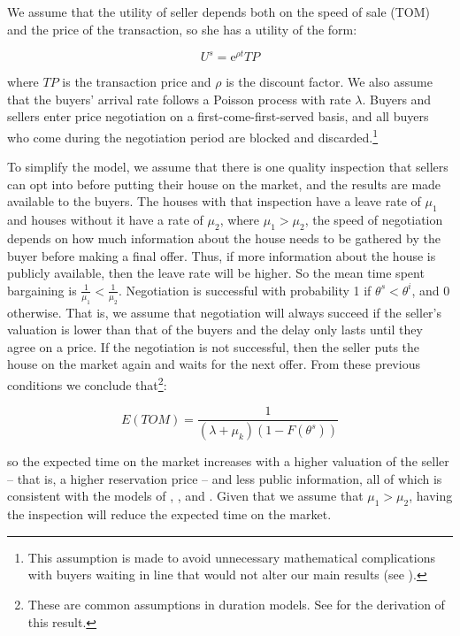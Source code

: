 \documentclass[12pt]{article}
\begin{document}
We assume that the utility of seller depends both on the speed of sale (TOM) and the price of the transaction, so she has a utility of the form:

\begin{equation}
U^s = \mathrm{e}^{\rho t} TP
\end{equation}

\noindent where $TP$ is the transaction price and $\rho$ is the discount factor. We also assume that the buyers' arrival rate follows a Poisson process with rate $\lambda$. Buyers and sellers enter price negotiation on a first-come-first-served basis, and all buyers who come during the negotiation period are blocked and discarded.\footnote{This assumption is made to avoid unnecessary mathematical complications with buyers waiting in line that would not alter our main results (see \citealp{ross2014introduction}).}

To simplify the model, we assume that there is one quality inspection that sellers can opt into before putting their house on the market, and the results are made available to the buyers. The houses with that inspection have a leave rate of $\mu_1$ and houses without it have a rate of $\mu_2$, where $\mu_1 > \mu_2$, the speed of negotiation depends on how much information about the house needs to be gathered by the buyer before making a final offer. Thus, if more information about the house is publicly available, then the leave rate will be higher. So the mean time spent bargaining is $\frac{1}{\mu_1} < \frac{1}{\mu_2}$. Negotiation is successful with probability 1 if $\theta^s < \theta^i$, and 0 otherwise. That is, we assume that negotiation will always succeed if the seller’s valuation is lower than that of the buyers and the delay only lasts until they agree on a price. If the negotiation is not successful, then the seller puts the house on the market again and waits for the next offer. From these previous conditions we conclude that\footnote{These are common assumptions in duration models. See \cite{lancaster1979econometric} for the derivation of this result.}:

\begin{equation}
E(TOM) = \frac{1}{\left( \lambda + \mu_k \right) \left(1 - F(\theta^s) \right)}
\end{equation}
		
\noindent so the expected time on the market increases with a higher valuation of the seller – that is, a higher reservation price – and less public information, all of which is consistent with the models of \cite{taylor1999time}, \cite{kurlat2015testing}, and \cite{han2016role}. Given that we assume that $\mu_1 > \mu_2$, having the inspection will reduce the expected time on the market.
\end{document}
